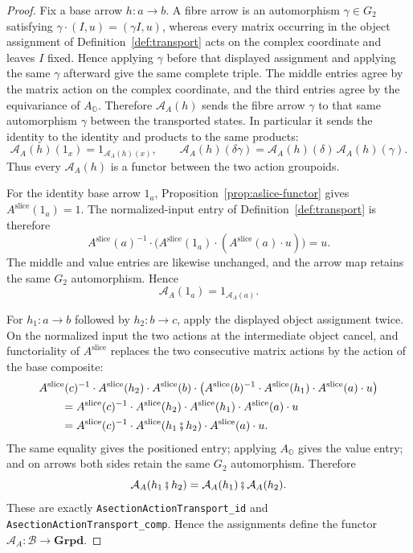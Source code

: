 \documentclass[11pt]{article}
\newcommand{\OO}{\mathbb{O}}
\theoremstyle{plain}
\theoremstyle{definition}
\theoremstyle{remark}
\begin{document}
\begin{proof}
Fix a base arrow $h:a\to b$.  A fibre arrow is an automorphism
$\gamma\in G_2$ satisfying $\gamma\cdot(I,u)=(\gamma I,u)$, whereas every
matrix occurring in the object assignment of
Definition~\ref{def:transport} acts on the complex coordinate and leaves
$I$ fixed.  Hence applying $\gamma$ before that displayed assignment and
applying the same $\gamma$ afterward give the same complete triple.  The
middle entries agree by the matrix action on the complex coordinate, and
the third entries agree by the equivariance of $A_{\OO}$.  Therefore
$\mathcal A_A(h)$ sends the fibre arrow $\gamma$ to that same automorphism
$\gamma$ between the transported states.  In particular it sends the
identity to the identity and products to the same
products:
\[
 \mathcal A_A(h)(1_x)=1_{\mathcal A_A(h)(x)},\qquad
 \mathcal A_A(h)(\delta\gamma)
   =\mathcal A_A(h)(\delta)\,\mathcal A_A(h)(\gamma).
\]
Thus every $\mathcal A_A(h)$ is a functor between the two action groupoids.

For the identity base arrow $1_a$, Proposition~\ref{prop:aslice-functor}
gives $A^{\mathrm{slice}}(1_a)=1$.  The normalized-input entry of
Definition~\ref{def:transport} is therefore
\[
 A^{\mathrm{slice}}(a)^{-1}\mathbin{\cdot}
 \bigl(A^{\mathrm{slice}}(1_a)\mathbin{\cdot}
 (A^{\mathrm{slice}}(a)\mathbin{\cdot}u)\bigr)=u.
\]
The middle and value entries are likewise unchanged, and the arrow map
retains the same $G_2$ automorphism.  Hence
\[
 \mathcal A_A(1_a)=1_{\mathcal A_A(a)}.
\]

For $h_1:a\to b$ followed by $h_2:b\to c$, apply the displayed object
assignment twice.  On the normalized input the two actions at the
intermediate object cancel, and functoriality of $A^{\mathrm{slice}}$
replaces the two consecutive matrix actions by the action of the base
composite:
\[
\begin{aligned}
 &A^{\mathrm{slice}}(c)^{-1}\mathbin{\cdot}
 A^{\mathrm{slice}}(h_2)\mathbin{\cdot}
 A^{\mathrm{slice}}(b)\mathbin{\cdot}
 \left(A^{\mathrm{slice}}(b)^{-1}\mathbin{\cdot}
 A^{\mathrm{slice}}(h_1)\mathbin{\cdot}
 A^{\mathrm{slice}}(a)\mathbin{\cdot}u\right)\\
 &\qquad=
 A^{\mathrm{slice}}(c)^{-1}\mathbin{\cdot}
 A^{\mathrm{slice}}(h_2)\mathbin{\cdot}
 A^{\mathrm{slice}}(h_1)\mathbin{\cdot}
 A^{\mathrm{slice}}(a)\mathbin{\cdot}u\\
 &\qquad=
 A^{\mathrm{slice}}(c)^{-1}\mathbin{\cdot}
 A^{\mathrm{slice}}(h_1\fatsemi h_2)\mathbin{\cdot}
 A^{\mathrm{slice}}(a)\mathbin{\cdot}u.
\end{aligned}
\]
The same equality gives the positioned entry; applying $A_{\OO}$ gives
the value entry; and on arrows both sides retain the same $G_2$ automorphism.
Therefore
\[
 \mathcal A_A(h_1\fatsemi h_2)
   =\mathcal A_A(h_1)\fatsemi\mathcal A_A(h_2).
\]
These are exactly
\texttt{AsectionActionTransport\_id} and
\texttt{AsectionActionTransport\_comp}.  Hence the assignments define the
functor $\mathcal A_A:\mathcal B\to\mathbf{Grpd}$.
\end{proof}
\end{document}
